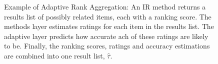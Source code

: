 \begin{figure}[t]
  \vspace{1em}
  \caption[Example of Adaptive Rank Aggregation]{
    Example of Adaptive Rank Aggregation: 
    An IR method returns a results list of possibly related items, each with a ranking score.
    The methods layer estimates ratings for each item in the results list.
    The adaptive layer predicts how accurate ach of these ratings are likely to be.
    Finally, the ranking scores, ratings and accuracy estimations are combined
    into one result list, $\hat{\tau}$.
  }
  \label{fig:adaptiverank}
\end{figure}
